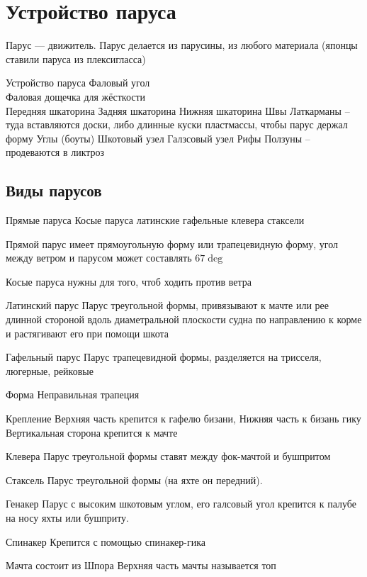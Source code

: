 \documentclass{article}        %
\begin{document}




\section{Устройство паруса}          
Парус --- движитель. Парус делается из парусины, из любого материала (японцы ставили паруса из плексигласса)

Устройство паруса
	Фаловый угол \\
	Фаловая дощечка для жёсткости \\
	Передняя шкаторина
	Задняя шкаторина
	Нижняя шкаторина
	Швы
	Латкарманы -- туда вставляются доски, либо длинные куски пластмассы, чтобы парус держал форму
	Углы (боуты)
	Шкотовый узел
	Галзсовый узел
	Рифы
	Ползуны -- продеваются в ликтроз

\subsection{Виды парусов}
Прямые паруса
Косые паруса
	латинские
	гафельные
	клевера
	стаксели

Прямой парус имеет прямоугольную форму или трапецевидную форму, угол между ветром и парусом может составлять $67\deg$

Косые паруса нужны для того, чтоб ходить против ветра

Латинский парус
Парус треугольной формы, привязывают к мачте или рее длинной стороной вдоль диаметральной плоскости судна по направлению к корме и растягивают его при помощи шкота

Гафельный парус
Парус трапецевидной формы, разделяется на трисселя, люгерные, рейковые

Форма
Неправильная трапеция

Крепление
Верхняя часть крепится к гафелю бизани, 
Нижняя часть к бизань гику
Вертикальная сторона крепится к мачте

Клевера
Парус треугольной формы ставят между фок-мачтой и бушпритом


Стаксель
Парус треугольной формы (на яхте он передний).

Генакер
Парус с высоким шкотовым углом, его галсовый угол крепится к палубе на носу яхты или бушприту.

Спинакер
Крепится с помощью спинакер-гика

Мачта состоит из 
Шпора
Верхняя часть мачты называется топ
\end{document}
